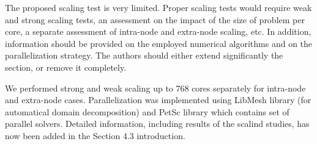 \documentclass[answers,11pt]{exam}
\begin{document}
\begin{questions}
\question The proposed scaling test is very limited. Proper scaling tests would require weak and strong scaling tests, an assessment on the impact of the size of problem per core, a separate assessment of intra-node and extra-node scaling, etc. In addition, information should be provided on the employed numerical algorithms and on the parallelization strategy. The authors should either extend significantly the section, or remove it completely.
\begin{solution}
        We performed strong and weak scaling up to 768 cores separately for 
        intra-node and extra-node cases. Parallelization was implemented using 
        LibMesh library (for automatical domain decomposition) and PetSc 
        library which contains set of parallel solvers. Detailed information, 
        including results of the scalind studies, has now been added in the 
        Section 4.3 introduction.
\end{solution}


\end{questions}


  
\end{document}
